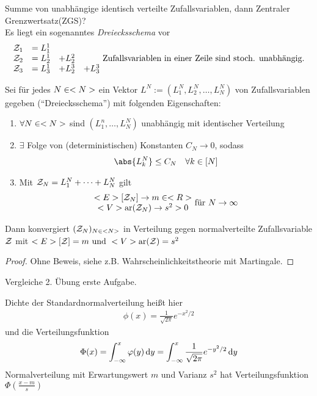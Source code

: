 Summe von unabhängige identisch verteilte Zufallsvariablen, dann Zentraler Grenzwertsatz(ZGS)?\\
Es liegt ein sogenanntes \emph{Dreiecksschema} vor
\begin{align*}
	\begin{matrix}
	\mathcal{Z}_1 &= L_1^1 & &\\
	\mathcal{Z}_2 &= L_2^1 &+L^2_2 &\\
	\mathcal{Z}_3 &= L_3^1 &+L^3_2 &+L^3_3\\
	\end{matrix} \text{ Zufallsvariablen in einer Zeile sind stoch. unabhängig.}
\end{align*}
\begin{theorem}
	Sei für jedes $N \in <N>$ ein Vektor $L^N := (L^N_1, L^N_2, \dots, L^N_N)$ von Zufallsvariablen gegeben (``Dreiecksschema'') mit folgenden Eigenschaften:
	\begin{enumerate}
		\item $\forall N \in <N>$ sind $(L^n_1, \dots, L_N^N)$ unabhängig mit identischer Verteilung
		\item $\exists$ Folge von (deterministischen) Konstanten $C_N \to 0$, sodass
		\begin{align*}
			\abs{L_k^N} \le C_N \quad \forall k \in [N]
		\end{align*}
		\item Mit $\mathcal{Z}_N = L^N_1 + \dots + L^N_N$ gilt
		\begin{align*}
			\begin{matrix}
				<E>[\mathcal{Z}_N] \to m \in <R>\\
			<V>\text{ar}(\mathcal{Z}_N) \to s^2 > 0 
			\end{matrix}\text{ für }N \to \infty			
		\end{align*}
	\end{enumerate}
	Dann konvergiert $(\mathcal{Z}_N)_{N \in <N>}$ in Verteilung gegen normalverteilte Zufallsvariable $\mathcal{Z}$ mit $<E>[\mathcal{Z}] = m \text{ und } <V>\text{ar}(\mathcal{Z}) = s^2$
\end{theorem}
\begin{proof}
	Ohne Beweis, siehe z.B. Wahrscheinlichkeitstheorie mit Martingale.
\end{proof}
\begin{*remark}
	Vergleiche 2. Übung erste Aufgabe.
\end{*remark}
\begin{erinnerung} %
	Dichte der Standardnormalverteilung heißt hier
	\begin{align*}
		\phi(x) = \frac{1}{\sqrt{2\pi}} e^{-x^2/2}
	\end{align*}
	und die Verteilungsfunktion
	\begin{align*}
		\Phi(x) = \int_{-\infty}^x \varphi(y) \,\mathrm{d} y = \int_{-\infty}^x \frac{1}{\sqrt{2\pi}} e^{-y^2/2} \,\mathrm{d} y
	\end{align*}
	Normalverteilung mit Erwartungswert $m$ und Varianz $s^2$ hat Verteilungsfunktion $\Phi(\frac{x-m}{s})$
\end{erinnerung}
